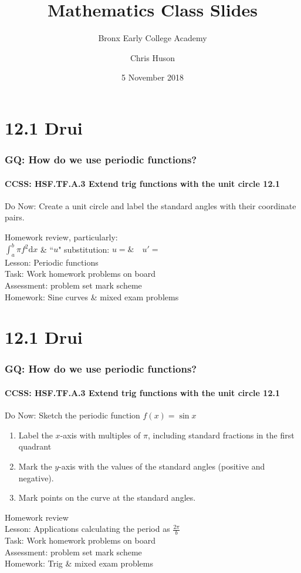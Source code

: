 \documentclass{beamer}
\title{Mathematics Class Slides}
\subtitle{Bronx Early College Academy}
\author{Chris Huson}
\date{5 November 2018}
\begin{document}
\frame{\titlepage}


  \section{12.1 Drui}
  \frame
  {
    \frametitle{GQ: How do we use periodic functions?}
    \framesubtitle{CCSS: HSF.TF.A.3 Extend trig functions with the unit circle \qquad \alert{12.1}}

    \begin{block}{Do Now: Create a unit circle and label the standard angles with their coordinate pairs.}
   \end{block}
    Homework review, particularly: \\ $\displaystyle \int_a^b \pi f^2 \text{d}x$ \&
  ``$u$" substitution: $u= \& \quad u'=$\\[5pt]
    Lesson: Periodic functions\\%
    Task: Work homework problems on board\\%
    Assessment: problem set mark scheme\\%
    Homework: Sine curves \& mixed exam problems
  }


  \section{12.1 Drui}
  \frame
  {
    \frametitle{GQ: How do we use periodic functions?}
    \framesubtitle{CCSS: HSF.TF.A.3 Extend trig functions with the unit circle \qquad \alert{12.1}}

    \begin{block}{Do Now: Sketch the periodic function $f(x)=\sin{x}$}
      \begin{enumerate}
      \item Label the $x$-axis with multiples of $\pi$, including standard fractions in the first quadrant
      \item Mark the $y$-axis with the values of the standard angles (positive and negative).
      \item Mark points on the curve at the standard angles.
      \end{enumerate}
   \end{block}
    Homework review\\[5pt]
    Lesson: Applications calculating the period as $\frac{2\pi}{b}$\\%
    Task: Work homework problems on board\\%
    Assessment: problem set mark scheme\\%
    Homework: Trig \& mixed exam problems
  }
\end{document}
